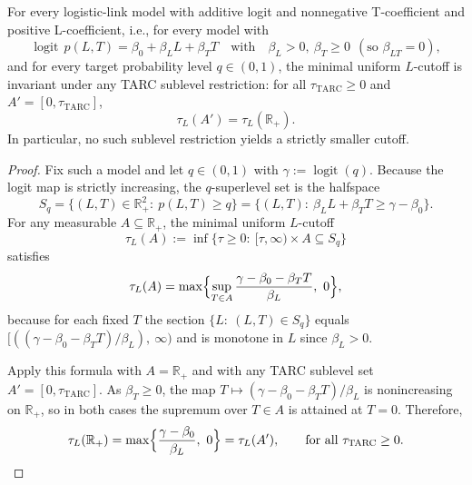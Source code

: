 ﻿\begin{theorem}\label{thm:logit-cutoff-invariance}
For every logistic-link model with additive logit and nonnegative T-coefficient and positive L-coefficient, i.e., for every model with
\[
\operatorname{logit}\,p(L,T)=\beta_0+\beta_L L+\beta_T T \quad\text{with}\quad \beta_L>0,\ \beta_T\ge 0\ \ (\text{so }\beta_{LT}=0),
\]
and for every target probability level $q\in(0,1)$, the minimal uniform $L$-cutoff is invariant under any TARC sublevel restriction: for all $\tau_{\mathrm{TARC}}\ge0$ and $A'=[0,\tau_{\mathrm{TARC}}]$,
\[
\tau_L(A')=\tau_L(\mathbb{R}_+).
\]
In particular, no such sublevel restriction yields a strictly smaller cutoff.
\end{theorem}

\begin{proof}
Fix such a model and let $q\in(0,1)$ with $\gamma:=\operatorname{logit}(q)$. Because the logit map is strictly increasing, the $q$-superlevel set is the halfspace
\[
S_q=\{(L,T)\in\mathbb{R}_+^2:\ p(L,T)\ge q\}
 = \{(L,T):\ \beta_L L+\beta_T T\ge \gamma-\beta_0\}.
\]
For any measurable $A\subseteq\mathbb{R}_+$, the minimal uniform $L$-cutoff
\[
\tau_L(A):=\inf\{\tau\ge0:\ [\tau,\infty)\times A\subseteq S_q\}
\]
satisfies
\[
\tau_L(A)=\max\Bigl\{\sup_{T\in A}\frac{\gamma-\beta_0-\beta_T T}{\beta_L},\ 0\Bigr\},
\]
because for each fixed $T$ the section $\{L:\ (L,T)\in S_q\}$ equals $[((\gamma-\beta_0-\beta_T T)/\beta_L),\ \infty)$ and is monotone in $L$ since $\beta_L>0$.

Apply this formula with $A=\mathbb{R}_+$ and with any TARC sublevel set $A'=[0,\tau_{\mathrm{TARC}}]$. As $\beta_T\ge0$, the map $T\mapsto (\gamma-\beta_0-\beta_T T)/\beta_L$ is nonincreasing on $\mathbb{R}_+$, so in both cases the supremum over $T\in A$ is attained at $T=0$. Therefore,
\[
\tau_L(\mathbb{R}_+)=\max\Bigl\{\frac{\gamma-\beta_0}{\beta_L},\ 0\Bigr\}
=\tau_L(A'), \qquad \text{for all }\tau_{\mathrm{TARC}}\ge0.\qedhere
\]
\end{proof}
